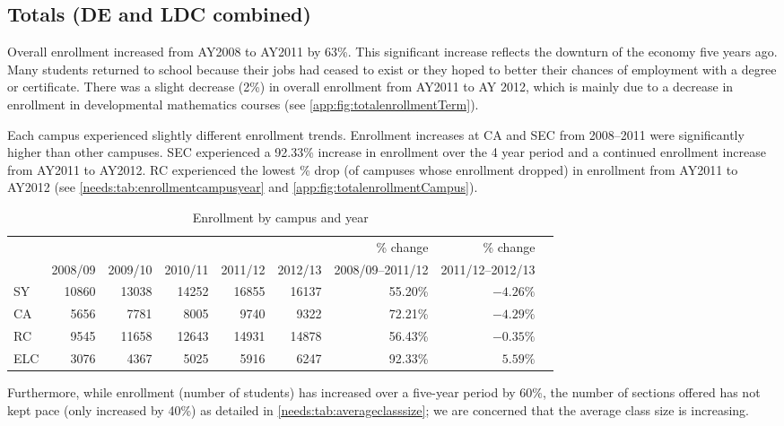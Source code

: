 \subsection{Totals (DE and LDC combined)}
Overall enrollment increased from AY2008 to AY2011 by 63\%. This significant
increase reflects the downturn of the economy five years ago. Many students
returned to school because their jobs had ceased to exist or they hoped to
better their chances of employment with a degree or certificate. There was a
slight decrease (2\%) in overall enrollment from AY2011 to AY 2012, which is
mainly due to a decrease in enrollment in developmental mathematics courses
(see \vref{app:fig:totalenrollmentTerm}).


Each campus experienced slightly different enrollment trends. Enrollment
increases at CA and SEC from 2008--2011 were significantly higher than other
campuses. SEC experienced a 92.33\% increase in enrollment over the 4 year
period and a continued enrollment increase from AY2011 to AY2012. RC
experienced the lowest \% drop (of campuses whose enrollment dropped)  in
enrollment from AY2011 to AY2012 (see \vref{needs:tab:enrollmentcampusyear} and
\vref{app:fig:totalenrollmentCampus}).

\begin{table}[!htb]
\begin{widepage}
	\centering
	\caption{Enrollment by campus and year}
	\label{needs:tab:enrollmentcampusyear}
	\begin{tabularx}{\linewidth}{X*{8}{r}}
		\toprule
		    &        &        &        &        &        & \% change & \% change \\
		    & 2008/09 & 2009/10 & 2010/11 & 2011/12 & 2012/13 & 2008/09--2011/12 & 2011/12--2012/13 \\
		\midrule
		SY  & 10860  & 13038  & 14252  & 16855  & 16137  & 55.20\%   & $-4.26\%$   \\
		CA  & 5656   & 7781   & 8005   & 9740   & 9322   & 72.21\%   & $-4.29\%$   \\
		RC  & 9545   & 11658  & 12643  & 14931  & 14878  & 56.43\%   & $-0.35\%$   \\
		ELC & 3076   & 4367   & 5025   & 5916   & 6247   & 92.33\%   & $5.59\%$    \\
		\bottomrule
	\end{tabularx}
	\end{widepage}
\end{table}

Furthermore, while enrollment (number of students) has increased over a
five-year period by 60\%, the number of sections offered has not kept pace
(only increased by 40\%) as detailed in \cref{needs:tab:averageclasssize}; we
are concerned that the average class size is increasing.


